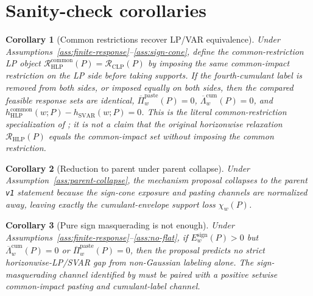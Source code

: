\documentclass[11pt]{article}
\theoremstyle{definition}
\theoremstyle{plain}
\newtheorem{corollary}{Corollary}
\theoremstyle{remark}
\begin{document}
\section{Sanity-check corollaries}
\begin{corollary}[Common restrictions recover LP/VAR equivalence]\label{cor:pmw}
Under Assumptions~\ref{ass:finite-response}--\ref{ass:sign-cone}, define the common-restriction LP object \(\mathcal R_{\mathrm{HLP}}^{\mathrm{common}}(P)=\mathcal R_{\mathrm{CLP}}(P)\) by imposing the same common-impact restriction on the LP side before taking supports.  If the fourth-cumulant label is removed from both sides, or imposed equally on both sides, then the compared feasible response sets are identical, \(\overline\Pi_w^{\mathrm{paste}}(P)=0\), \(\overline\Lambda_w^{\mathrm{cum}}(P)=0\), and \(h_{\mathrm{HLP}}^{\mathrm{common}}(w;P)-h_{\mathrm{SVAR}}(w;P)=0\).  This is the literal common-restriction specialization of \citet{PlagborgMollerWolf2021}; it is not a claim that the original horizonwise relaxation \(\mathcal R_{\mathrm{HLP}}(P)\) equals the common-impact set without imposing the common restriction.
\end{corollary}

\begin{corollary}[Reduction to parent under parent collapse]\label{cor:parent}
Under Assumption~\ref{ass:parent-collapse}, the mechanism proposal collapses to the parent \texttt{v1} statement because the sign-cone exposure and pasting channels are normalized away, leaving exactly the cumulant-envelope support loss \(\chi_w(P)\).
\end{corollary}

\begin{corollary}[Pure sign masquerading is not enough]\label{cor:sign-not-enough}
Under Assumptions~\ref{ass:finite-response}--\ref{ass:no-flat}, if \(E_w^{\mathrm{sign}}(P)>0\) but \(\overline\Lambda_w^{\mathrm{cum}}(P)=0\) or \(\overline\Pi_w^{\mathrm{paste}}(P)=0\), then the proposal predicts no strict horizonwise-LP/SVAR gap from non-Gaussian labeling alone.  The sign-masquerading channel identified by \citet{Wolf2022} must be paired with a positive setwise common-impact pasting and cumulant-label channel.
\end{corollary}
\end{document}

